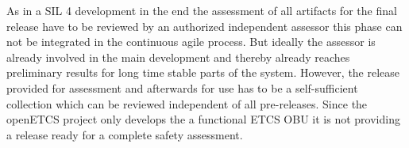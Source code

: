 As in a SIL 4 development in the end the assessment of all artifacts for the final release have to be reviewed by an authorized independent assessor this phase can not be integrated in the continuous agile process. But ideally the assessor is already involved in the main development and thereby already reaches  preliminary results for long time stable parts of the system. However, the release provided for assessment and afterwards for use has to be a self-sufficient collection which can be reviewed independent of all pre-releases. Since the openETCS project only develops the a functional ETCS OBU it is not providing a release ready for a complete safety assessment. 

%






